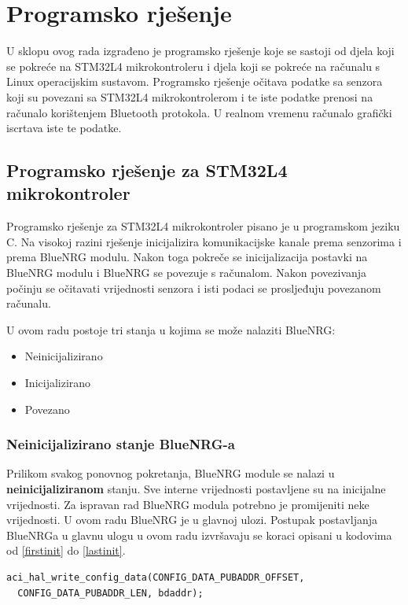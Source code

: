 \documentclass[times, utf8, diplomski]{diplomski}
\begin{document}
\chapter{Programsko rješenje}
U sklopu ovog rada izgrađeno je programsko rješenje koje se sastoji od djela koji se pokreće na STM32L4 mikrokontroleru i djela koji se pokreće na računalu s Linux operacijskim sustavom.
Programsko rješenje očitava podatke sa senzora koji su povezani sa STM32L4 mikrokontrolerom i te iste podatke prenosi na računalo korištenjem Bluetooth protokola.
U realnom vremenu računalo grafički iscrtava iste te podatke.

\section{Programsko rješenje za STM32L4 mikrokontroler}
Programsko rješenje za STM32L4 mikrokontroler pisano je u programskom jeziku C.
Na visokoj razini rješenje inicijalizira komunikacijske kanale prema senzorima i prema BlueNRG modulu.
Nakon toga pokreče se inicijalizacija postavki na BlueNRG modulu i BlueNRG se povezuje s računalom.
Nakon povezivanja počinju se očitavati vrijednosti senzora i isti podaci se prosljeđuju povezanom računalu.

U ovom radu postoje tri stanja u kojima se može nalaziti BlueNRG:

\begin{itemize}
  \item Neinicijalizirano
  \item Inicijalizirano
  \item Povezano
\end{itemize}

\subsection{Neinicijalizirano stanje BlueNRG-a}
Prilikom svakog ponovnog pokretanja, BlueNRG module se nalazi u \textbf{neinicijaliziranom} stanju. Sve interne vrijednosti postavljene su na inicijalne vrijednosti. Za ispravan rad BlueNRG modula potrebno je promijeniti neke vrijednosti. U ovom radu BlueNRG je u glavnoj ulozi. Postupak postavljanja BlueNRGa u glavnu ulogu u ovom radu izvršavaju se koraci opisani u kodovima od \ref{firstinit} do \ref{lastinit}.

\begin{lstlisting}[caption={Postavi MAC adresu}, label={firstinit}]
aci_hal_write_config_data(CONFIG_DATA_PUBADDR_OFFSET,
  CONFIG_DATA_PUBADDR_LEN, bdaddr);
\end{lstlisting}
\end{document}
